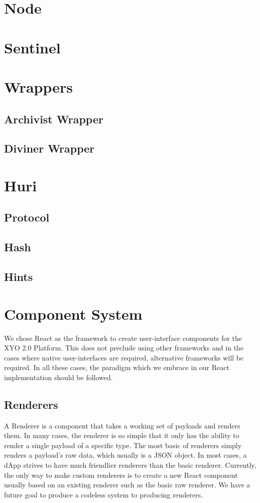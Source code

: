 \documentclass{article}
\begin{document}
\section{Node}
\section{Sentinel}
\section{Wrappers}
\subsection{Archivist Wrapper}
\subsection{Diviner Wrapper}
\section{Huri}
\subsection{Protocol}
\subsection{Hash}
\subsection{Hints}

\section{Component System}
We chose React as the framework to create user-interface components for the XYO 2.0 Platform.  This does not preclude using other frameworks and in the cases where native user-interfaces are required, alternative frameworks will be required.  In all these cases, the paradigm which we embrace in our React implementation should be followed.

\subsection{Renderers}
A Renderer is a component that takes a working set of payloads and renders them.  In many cases, the renderer is so simple that it only has the ability to render a single payload of a specific type.  The most basic of renderers simply renders a payload's raw data, which usually is a JSON object.  In most cases, a dApp strives to have much friendlier renderers than the basic renderer.  Currently, the only way to make custom renderers is to create a new React component usually based on an existing renderer such as the basic raw renderer.  We have a future goal to produce a codeless system to producing renderers.   
\end{document}
